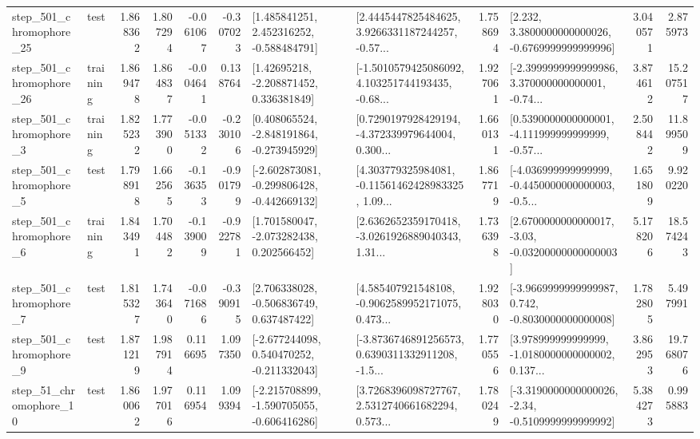 \begin{tabular}{llrrrrllrlrr}
  step\_501\_chromophore\_25 &      test &      1.868362 &    1.807294 &     -0.061067 & -0.307023 &    [1.485841251, 2.452316252, -0.588484791] &  [2.4445447825484625, 3.9266331187244257, -0.57... &       1.758694 &   [2.232, 3.3800000000000026, -0.6769999999999996] &            3.040571 &          2.875973 \\
  step\_501\_chromophore\_26 &  training &      1.869478 &    1.864837 &     -0.004641 &  0.138764 &     [1.42695218, -2.208871452, 0.336381849] &  [-1.5010579425086092, 4.103251744193435, -0.68... &       1.927061 &  [-2.3999999999999986, 3.370000000000001, -0.74... &            3.874612 &         15.207517 \\
   step\_501\_chromophore\_3 &  training &      1.825232 &    1.773900 &     -0.051332 & -0.230106 &   [0.408065524, -2.848191864, -0.273945929] &  [0.7290197928429194, -4.372339979644004, 0.300... &       1.660131 &  [0.5390000000000001, -4.111999999999999, -0.57... &            2.508442 &         11.899509 \\
   step\_501\_chromophore\_5 &      test &      1.798918 &    1.662565 &     -0.136353 & -0.901799 &  [-2.602873081, -0.299806428, -0.442669132] &  [4.303779325984081, -0.11561462428983325, 1.09... &       1.867719 &  [-4.036999999999999, -0.4450000000000003, -0.5... &            1.651809 &          9.920220 \\
   step\_501\_chromophore\_6 &  training &      1.843491 &    1.704482 &     -0.139009 & -0.922781 &    [1.701580047, -2.073282438, 0.202566452] &  [2.6362652359170418, -3.0261926889040343, 1.31... &       1.736398 &  [2.6700000000000017, -3.03, -0.03200000000000003] &            5.178206 &         18.574243 \\
   step\_501\_chromophore\_7 &      test &      1.815327 &    1.743640 &     -0.071686 & -0.390915 &    [2.706338028, -0.506836749, 0.637487422] &  [4.585407921548108, -0.9062589952171075, 0.473... &       1.928030 &  [-3.9669999999999987, 0.742, -0.8030000000000008] &            1.782805 &          5.497991 \\
   step\_501\_chromophore\_9 &      test &      1.871219 &    1.987914 &      0.116695 &  1.097350 &   [-2.677244098, 0.540470252, -0.211332043] &  [-3.8736746891256573, 0.6390311332911208, -1.5... &       1.770556 &  [3.978999999999999, -1.0180000000000002, 0.137... &            3.862953 &         19.768076 \\
   step\_51\_chromophore\_10 &      test &      1.860062 &    1.977016 &      0.116954 &  1.099394 &  [-2.215708899, -1.590705055, -0.606416286] &  [3.7268396098727767, 2.5312740661682294, 0.573... &       1.780249 &  [-3.3190000000000026, -2.34, -0.5109999999999992] &            5.384273 &          0.995883 \\

\end{tabular}
